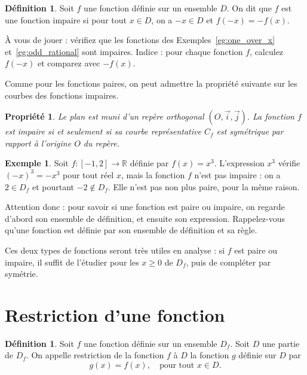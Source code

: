 \documentclass[12pt,a4paper]{article}
\theoremstyle{plain}
\newtheorem{property}[theorem]{Propriété}
\theoremstyle{definition}
\newtheorem{definition}[theorem]{Définition}
\newtheorem{example}[theorem]{Exemple}
\theoremstyle{remark}
\begin{document}
\begin{tcolorbox}[navybar]
  \begin{definition}
    Soit $f$ une fonction définie sur un ensemble $D$. On dit que $f$ est une
    fonction impaire si pour tout $x \in D$, on a $-x \in D$ et $f(-x) = -f(x)$.
  \end{definition}
\end{tcolorbox}

À vous de jouer : vérifiez que les fonctions des Exemples~\ref{eg:one_over_x}
et~\ref{eg:odd_rational} sont impaires. Indice : pour chaque fonction $f$, calculez
$f(-x)$ et comparez avec $-f(x)$.

Comme pour les fonctions paires, on peut admettre la propriété suivante sur les
courbes des fonctions impaires.

\begin{tcolorbox}[graybar]
  \begin{property}
    Le plan est muni d'un repère orthogonal $(O, \vec{i}, \vec{j})$. La fonction $f$
    est impaire si et seulement si sa courbe représentative $C_f$ est symétrique par
    rapport à l'origine $O$ du repère.
  \end{property}
\end{tcolorbox}

\begin{example}
  Soit $f : [-1, 2] \rightarrow \mathbb{R}$ définie par $f(x) = x^3$. L'expression
  $x^3$ vérifie $(-x)^3 = -x^3$ pour tout réel $x$, mais la fonction $f$ n'est pas
  impaire : on a $2 \in D_f$ et pourtant $-2 \notin D_f$. Elle n'est pas non plus
  paire, pour la même raison.
  
  Attention donc : pour savoir si une fonction est paire ou impaire, on regarde
  d'abord son ensemble de définition, et ensuite son expression. Rappelez-vous
  qu'une fonction est définie par son ensemble de définition et sa règle.
\end{example}

Ces deux types de fonctions seront très utiles en analyse : si $f$ est paire ou
impaire, il suffit de l'étudier pour les $x \ge 0$ de $D_f$, puis de compléter par
symétrie.

\section{Restriction d'une fonction}

\begin{tcolorbox}[navybar]
  \begin{definition}
    Soit $f$ une fonction définie sur un ensemble $D_f$. Soit $D$ une partie de
    $D_f$. On appelle restriction de la fonction $f$ à $D$ la fonction $g$ définie
    sur $D$ par
    \[
    g(x) = f(x), \quad \text{pour tout } x \in D.
    \]
  \end{definition}
\end{tcolorbox}
\end{document}
